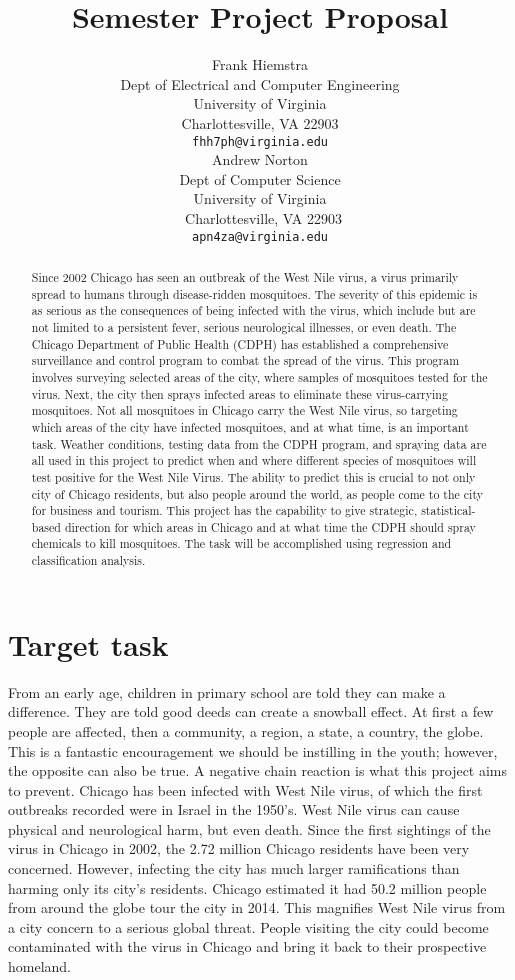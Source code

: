 \documentclass{article} %
\title{Semester Project Proposal}
\author{
Frank Hiemstra \\
Dept of Electrical and Computer Engineering\\
University of Virginia\\
Charlottesville, VA 22903\\
\texttt{fhh7ph@virginia.edu} \\
\And
Andrew Norton \\
Dept of Computer Science \\
University of Virginia \\\
Charlottesville, VA 22903 \\
\texttt{apn4za@virginia.edu} \\
}
\begin{document}
\maketitle

\begin{abstract}
Since 2002 Chicago has seen an outbreak of the West Nile virus, a virus primarily spread to humans through disease-ridden mosquitoes. The severity of this epidemic is as serious as the consequences of being infected with the virus, which include but are not limited to a persistent fever, serious neurological illnesses, or even death.  The Chicago Department of Public Health (CDPH) has established a comprehensive surveillance and control program to combat the spread of the virus.  This program involves surveying selected areas of the city, where samples of mosquitoes tested for the virus.  Next, the city then sprays infected areas to eliminate these virus-carrying mosquitoes.  Not all mosquitoes in Chicago carry the West Nile virus, so targeting which areas of the city have infected mosquitoes, and at what time, is an important task.  Weather conditions, testing data from the CDPH program, and spraying data are all used in this project to predict when and where different species of mosquitoes will test positive for the West Nile Virus. The ability to predict this is crucial to not only city of Chicago residents, but also people around the world, as people come to the city for business and tourism.  This project has the capability to give strategic, statistical-based direction for which areas in Chicago and at what time the CDPH should spray chemicals to kill mosquitoes.  The task will be accomplished using regression and classification analysis.
\end{abstract}

\section{Target task}
From an early age, children in primary school are told they can make a difference.  They are told good deeds can create a snowball effect.  At first a few people are affected, then a community, a region, a state, a country, the globe.  This is a fantastic encouragement we should be instilling in the youth; however, the opposite can also be true.  A negative chain reaction is what this project aims to prevent.  Chicago has been infected with West Nile virus, of which the first outbreaks recorded were in Israel in the 1950’s. West Nile virus can cause physical and neurological harm, but even death.  Since the first sightings of the virus in Chicago in 2002, the 2.72 million Chicago residents have been very concerned.  However, infecting the city has much larger ramifications than harming only its city’s residents.  Chicago estimated it had 50.2 million people from around the globe tour the city in 2014.  This magnifies West Nile virus from a city concern to a serious global threat. People visiting the city could become contaminated with the virus in Chicago and bring it back to their prospective homeland.  
\end{document}
